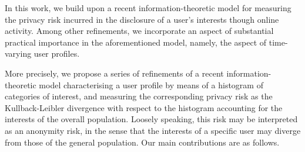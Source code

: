 In this work, we build upon a recent information-theoretic model for measuring the privacy risk incurred in the disclosure of a user's interests though online activity. Among other refinements, we incorporate an aspect of substantial practical importance in the aforementioned model, namely, the aspect of time-varying user profiles.

More precisely, we propose a series of refinements of a recent information-theoretic model characterising a user profile by means of a histogram of categories of interest, and measuring the corresponding privacy risk as the Kullback-Leibler divergence with respect to the histogram accounting for the interests of the overall population. Loosely speaking, this risk may be interpreted as an anonymity risk, in the sense that the interests of a specific user may diverge from those of the general population. Our main contributions are as follows.
 

